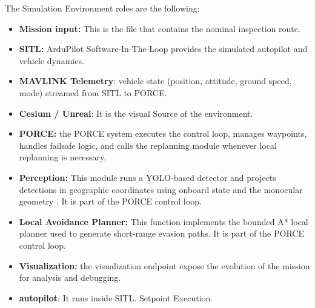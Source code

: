 \documentclass[journal,twoside,web]{ieeecolor}
\begin{document}
The Simulation Environment roles are the following:
\begin{itemize}
    \item \textbf{Mission input:} This is the file that contains the nominal inspection route.
    \item \textbf{SITL:} ArduPilot Software-In-The-Loop provides the simulated autopilot and vehicle dynamics.
    \item \textbf{MAVLINK Telemetry}: vehicle state (position, attitude, ground speed, mode) streamed from SITL to PORCE.
    \item \textbf{Cesium / Unreal}: It is the visual Source of the environment. 
    \item \textbf{PORCE:} the PORCE system executes the control loop, manages waypoints, handles failsafe logic, and calls the replanning module whenever local replanning is necessary.
    \item \textbf{Perception:} This module runs a YOLO-based detector and projects detections in geographic coordinates using onboard state and the monocular geometry \cite{alaez2023real}. It is part of the PORCE control loop. 
    \item \textbf{Local Avoidance Planner:} This function implements the bounded A* local planner used to generate short-range evasion paths. It is part of the PORCE control loop. 
    \item \textbf{Visualization:} the visualization endpoint expose the evolution of the mission for analysis and debugging.
    \item \textbf{autopilot}: It runs inside SITL. Setpoint Execution. 
\end{itemize}
\end{document}
